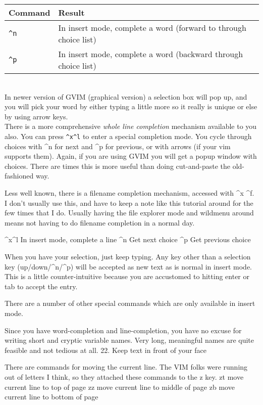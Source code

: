 \documentclass[a4paper, 12pt]{article}
\begin{document}
\begin{tabular}{ l | p{8cm} }
  \textbf{Command} & \textbf{Result}\\ \hline
  \texttt{\^{}n} & In insert mode, complete a word (forward to through choice list)\\
  \texttt{\^{}p} & In insert mode, complete a word (backward through choice list)\\ \hline
\end{tabular}\\

In newer version of GVIM (graphical version) a selection box will pop up, and you will pick your word by either typing a little more so it really is unique or else by using arrow keys.\\
There is a more comprehensive \textit{whole line completion} mechanism available to you also. You can press \texttt{\^{}x\^{}l} to enter a special completion mode. You cycle through choices with ^n for next and ^p for previous, or with arrows (if your vim supports them). Again, if you are using GVIM you will get a popup window with choices. There are times this is more useful than doing cut-and-paste the old-fashioned way.

      Less well known, there is a filename completion mechanism, accessed with ^x ^f. I don't usually use this, and have to keep a note like this tutorial around for the few times that I do. Usually having the file explorer mode and wildmenu around means not having to do filename completion in a normal day.

      ^x^l	In insert mode, complete a line
      ^n	Get next choice
      ^p	Get previous choice

      When you have your selection, just keep typing. Any key other than a selection key (up/down/^n/^p) will be accepted as new text as is normal in insert mode. This is a little counter-intuitive because you are accustomed to hitting enter or tab to accept the entry.

      There are a number of other special commands which are only available in insert mode.

      Since you have word-completion and line-completion, you have no excuse for writing short and cryptic variable names. Very long, meaningful names are quite feasible and not tedious at all.
  22. Keep text in front of your face

      There are commands for moving the current line. The VIM folks were running out of letters I think, so they attached these commands to the z key.
      zt	move current line to top of page
      zz	move current line to middle of page
      zb	move current line to bottom of page
\end{document}
